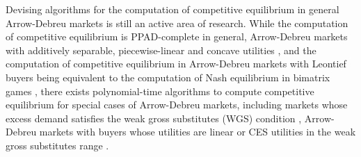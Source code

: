 Devising algorithms for the computation of competitive equilibrium in general Arrow-Debreu markets is still an active area of research.
While the computation of competitive equilibrium is PPAD-complete in general,  Arrow-Debreu markets with additively separable, piecewise-linear and concave utilities \cite{chen2006settling}, and the computation of competitive equilibrium in Arrow-Debreu markets with Leontief buyers being equivalent to the computation of Nash equilibrium in bimatrix games \cite{codenotti2006leontief, deng2008computation}, there exists polynomial-time algorithms to compute competitive equilibrium for special cases of Arrow-Debreu markets, including markets whose excess demand satisfies the weak gross substitutes (WGS) condition \cite{codenotti2005market, bei2015tatonnement}, Arrow-Debreu markets with buyers whose utilities are linear \cite{garg2004auction, branzei2021proportional} or CES utilities in the weak gross substitutes range \cite{branzei2021proportional}.
